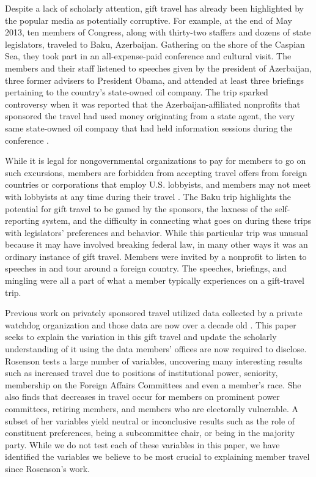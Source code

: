 \documentclass[12pt]{article}                           %
\begin{document}
Despite a lack of scholarly attention, gift travel has already been highlighted by the popular media as potentially corruptive. For example, at the end of May 2013, ten members of Congress, along with thirty-two staffers and dozens of state legislators, traveled to Baku, Azerbaijan. Gathering on the shore of the Caspian Sea, they took part in an all-expense-paid conference and cultural visit. The members and their staff listened to speeches given by the president of Azerbaijan, three former advisers to President Obama, and attended at least three briefings pertaining to the country's state-owned oil company. The trip sparked controversy when it was reported that the Azerbaijan-affiliated nonprofits that sponsored the travel had used money originating from a state agent, the very same state-owned oil company that had held information sessions during the conference \citep{Tucker2014}.

While it is legal for nongovernmental organizations to pay for members to go on such excursions, members are forbidden from accepting travel offers from foreign countries or corporations that employ U.S. lobbyists, and members may not meet with lobbyists at any time during their travel \citep{Wickham2015}. The Baku trip highlights the potential for gift travel to be gamed by the sponsors, the laxness of the self-reporting system, and the difficulty in connecting what goes on during these trips with legislators' preferences and behavior. While this particular trip was unusual because it may have involved breaking federal law, in many other ways it was an ordinary instance of gift travel. Members were invited by a nonprofit to listen to speeches in and tour around a foreign country. The speeches, briefings, and mingling were all a part of what a member typically experiences on a gift-travel trip.

Previous work on privately sponsored travel utilized data collected by a private watchdog organization and those data are now over a decade old \citep{Rosenson2009}. This paper seeks to explain the variation in this gift travel and update the scholarly understanding of it using the data members' offices are now required to disclose. Rosenson tests a large number of variables, uncovering many interesting results such as increased travel due to positions of institutional power, seniority, membership on the Foreign Affairs Committees and even a member's race. She also finds that decreases in travel occur for members on prominent power committees, retiring members, and members who are electorally vulnerable. A subset of her variables yield neutral or inconclusive results such as the role of constituent preferences, being a subcommittee chair, or being in the majority party. While we do not test each of these variables in this paper, we have identified the variables we believe to be most crucial to explaining member travel since Rosenson's work.
\end{document}
